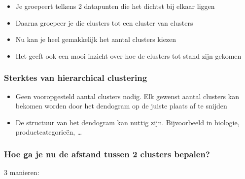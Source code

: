 \documentclass{article}
\begin{document}
\begin{itemize}
    \item Je groepeert telkens 2 datapunten die het dichtst bij elkaar liggen
    \item Daarna groepeer je die clusters tot een cluster van clusters
    \item Nu kan je heel gemakkelijk het aantal clusters kiezen
    \item Het geeft ook een mooi inzicht over hoe de clusters tot stand zijn gekomen
\end{itemize}

\subsubsection{Sterktes van hierarchical clustering}

\begin{itemize}
    \item Geen vooropgesteld aantal clusters nodig. Elk gewenst aantal clusters kan bekomen worden door het dendogram op de juiste plaats af te snijden
    \item De structuur van het dendogram kan nuttig zijn. Bijvoorbeeld in biologie, productcategorieën, \dots
\end{itemize}

\subsubsection{Hoe ga je nu de afstand tussen 2 clusters bepalen?}

3 manieren:
\end{document}

